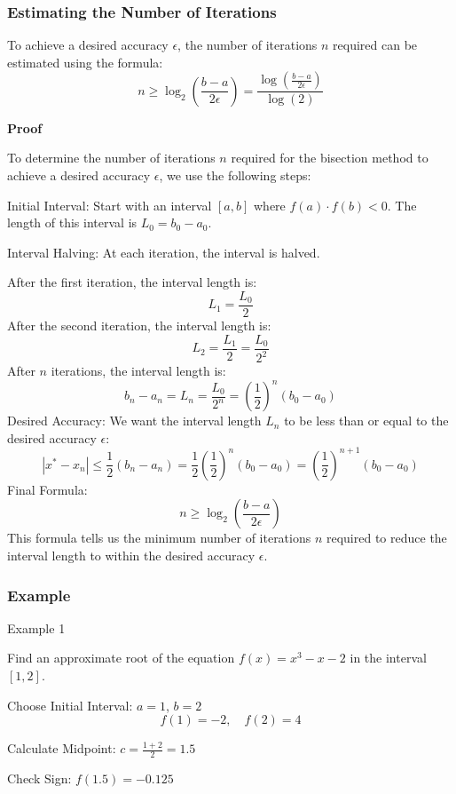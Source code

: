 \documentclass[12pt,a4paper]{article}
\begin{document}
{\subsubsection{Estimating the Number of Iterations}

To achieve a desired accuracy \( \epsilon \), the number of iterations \( n \) required can be estimated using the formula:
\[
n \geq \log_2\left(\frac{b - a}{2\epsilon}\right) = \frac{\log\left(\frac{b - a}{2\epsilon}\right)}{\log(2)} 
\]

\textbf{Proof}

To determine the number of iterations \( n \) required for the bisection method to achieve a desired accuracy \( \epsilon \), we use the following steps:

Initial Interval: Start with an interval \([a, b]\) where \( f(a) \cdot f(b) < 0 \). The length of this interval is \( L_0 = b_0 - a_0 \).

Interval Halving: At each iteration, the interval is halved. 

After the first iteration, the interval length is:
\[
L_1 = \frac{L_0}{2}
\]
After the second iteration, the interval length is:
\[
L_2 = \frac{L_1}{2} = \frac{L_0}{2^2}
\]
After \( n \) iterations, the interval length is:
\[
b_n-a_n = L_n =   \frac{L_0}{2^n} = \left(\dfrac{1}{2}\right)^n (b_0 - a_0)
\]
Desired Accuracy: We want the interval length \( L_n \) to be less than or equal to the desired accuracy \( \epsilon \):
\[
|x^* - x_n| \leq \dfrac{1}{2}(b_n-a_n) = \dfrac{1}{2}\left(\dfrac{1}{2}\right)^n (b_0 - a_0) = \left(\dfrac{1}{2}\right)^{n+1} (b_0 - a_0)
\]
Final Formula:
\[
n \geq \log_2\left(\frac{b - a}{2\epsilon}\right)
\]
This formula tells us the minimum number of iterations \( n \) required to reduce the interval length to within the desired accuracy \( \epsilon \).

\subsubsection{Example}

Example 1

Find an approximate root of the equation \( f(x) = x^3 - x - 2 \) in the interval \([1, 2]\).

Choose Initial Interval: \( a = 1 \), \( b = 2 \)
\[
f(1) = -2, \quad f(2) = 4
\]

Calculate Midpoint: \( c = \frac{1 + 2}{2} = 1.5 \)

Check Sign: \( f(1.5) = -0.125 \)

}
\end{document}
